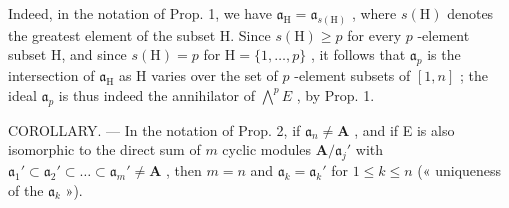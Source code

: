 Indeed, in the notation of Prop. 1, we have \(\mathfrak{a}_{\mathrm{H}} = \mathfrak{a}_{s(\mathrm{H})}\) , where \(s(\mathrm{H})\) denotes the greatest element of the subset H. Since \(s(\mathrm{H}) \geqslant p\) for every \(p\) -element subset H, and since \(s(\mathrm{H}) = p\) for \(\mathrm{H} = \{1, \dots, p\}\) , it follows that \(\mathfrak{a}_p\) is the intersection of \(\mathfrak{a}_{\mathrm{H}}\) as H varies over the set of \(p\) -element subsets of \([1, n]\) ; the ideal \(\mathfrak{a}_p\) is thus indeed the annihilator of \(\bigwedge^p E\) , by Prop. 1.

COROLLARY. --- In the notation of Prop. 2, if \(\mathfrak{a}_n \neq \mathbf{A}\) , and if E is also isomorphic to the direct sum of \(m\) cyclic modules \(\mathbf{A} / \mathfrak{a}_j'\) with \(\mathfrak{a}_1' \subset \mathfrak{a}_2' \subset \ldots \subset \mathfrak{a}_m' \neq \mathbf{A}\) , then \(m = n\) and \(\mathfrak{a}_k = \mathfrak{a}_k'\) for \(1 \leqslant k \leqslant n\) (« uniqueness of the \(\mathfrak{a}_k\) »).
